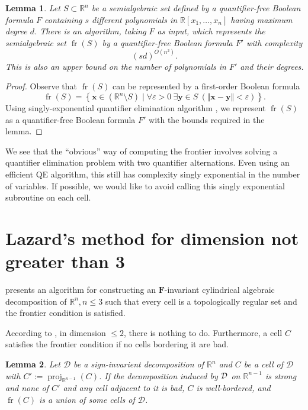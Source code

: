 \documentclass[
]{book}
\newtheorem{lemma}{Lemma}[chapter]
\theoremstyle{definition}
\theoremstyle{definition}
\theoremstyle{definition}
\theoremstyle{definition}
\theoremstyle{remark}
\begin{document}
\begin{lemma}
Let \(S \subset \mathbb{R}^n\) be a semialgebraic set defined by a quantifier-free Boolean formula \(F\)
containing \(s\) different polynomials in \(\mathbb{R}[x_1, \ldots ,x_n]\) having maximum degree \(d\).
There is an algorithm, taking \(F\) as input, which represents the semialgebraic set \({\operatorname{fr} \left(  S  \right)}\) by a quantifier-free Boolean formula \(F'\) with complexity
\[(sd)^{O(n^2)}.
\]
This is also an upper bound on the number of polynomials in \(F'\) and their degrees.
\end{lemma}

\begin{proof}
Observe that \({\operatorname{fr} \left(  S  \right)}\) can be represented by a first-order Boolean formula
\[
{\operatorname{fr} \left(  S  \right)} = \left\{ \mathbf{x} \in (\mathbb{R}^n \setminus S) \mid \forall \varepsilon >0\> \exists \mathbf{y} \in S\> (\Vert \mathbf{x} - \mathbf{y} \Vert < \varepsilon ) \right\}.
\]
Using singly-exponential quantifier elimination algorithm \citep[ Algorithm 14.21]{bpr2006}, we represent \({\operatorname{fr} \left(  S  \right)}\)
as a quantifier-free Boolean formula \(F'\) with the bounds required in the lemma.
\end{proof}

We see that the ``obvious'' way of computing the frontier involves solving a quantifier elimination problem with two quantifier alternations. Even using an efficient QE algorithm, this still has complexity singly exponential in the number of variables. If possible, we would like to avoid calling this singly exponential subroutine on each cell.

\hypertarget{sec:lazard-3}{%
\section{Lazard's method for dimension not greater than 3}\label{sec:lazard-3}}

\citet{lazard10} presents an algorithm for constructing an \(\mathbf{F}\)-invariant cylindrical algebraic decomposition of \(\mathbb{R}^n, n\le 3\) such that every cell is a topologically regular set and the frontier condition is satisfied.

According to \citep[TODO]{lazard10}, in dimension \(\le 2\), there is nothing to do. Furthermore, a cell \(C\) satisfies the frontier condition if no cells bordering it are bad.

\begin{lemma}
\protect\hypertarget{lem:no-blow-up}{}\label{lem:no-blow-up}\citep[Theorem 4.4]{lazard10}
Let \(\mathcal{D}\) be a sign-invarient decomposition of \(\mathbb{R}^n\) and \(C\) be a cell of \(\mathcal{D}\) with \(C' := \operatorname{proj}_{\mathbb{R}^{n-1}}(C)\). If the decomposition induced by \(\cal D\) on \(\mathbb{R}^{n-1}\) is strong and none of \(C'\) and any cell adjacent to it is bad, \(C\) is well-bordered, and \({\operatorname{fr} \left( C \right)}\) is a union of some cells of \(\mathcal{D}\).
\end{lemma}
\end{document}
